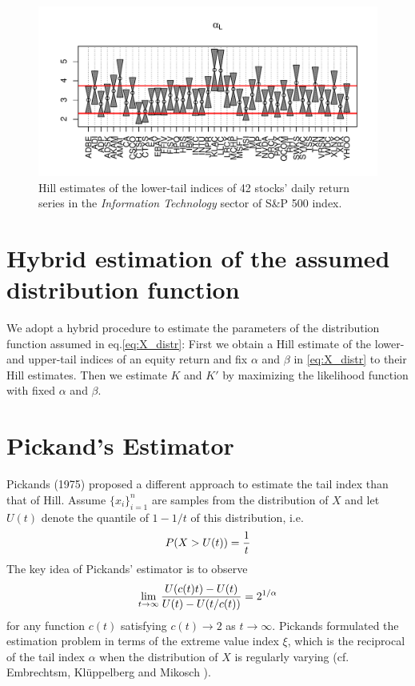 \documentclass{article}
\newcommand{\1}[1]{
  \mathbf{1}_{\{#1\}}
}
\begin{document}
\begin{figure}[htb!]
  \centering
  \includegraphics[width=\textwidth]{Information_Technology_lower.pdf}
  \caption{Hill estimates of the lower-tail indices of 42 stocks' daily
    return series in the {\it Information Technology} sector of S\&P
    500 index.
  }
  \label{fig:Information_Technology_lower}
\end{figure}

\section{Hybrid estimation of the assumed distribution function}
We adopt a hybrid procedure to estimate the parameters of the
distribution function assumed in eq.\eqref{eq:X_distr}: First we
obtain a Hill estimate of the lower- and upper-tail indices of an
equity return and fix $\alpha$ and $\beta$ in \eqref{eq:X_distr}
to their Hill estimates. Then we estimate $K$ and $K'$ by maximizing
the likelihood function with fixed $\alpha$ and $\beta$.

\section{Pickand's Estimator}
Pickands (1975) \cite{pickands1975statistical} proposed a different
approach to estimate the tail index than that of Hill. Assume
$\{x_i\}_{i=1}^n$ are samples from the distribution of $X$ and let $U(t)$
denote the quantile of $1 - 1/t$ of this distribution, i.e.
\[
P(X > U(t)) = {1 \over t}
\]
The key idea of Pickands' estimator is to observe
\[
\lim_{t \to \infty} {
  U(c(t) t) - U(t)
  \over
  U(t) - U(t/c(t))
} = 2^{1/\alpha}
\]
for any function $c(t)$ satisfying $c(t) \to 2$ as $t \to \infty$.
Pickands formulated the estimation problem in terms of the extreme
value index $\xi$, which is the reciprocal of the tail index $\alpha$
when the distribution of $X$ is regularly varying (cf. Embrechtsm,
Kl\"uppelberg and Mikosch \cite{Embrechts1997}).
\end{document}
